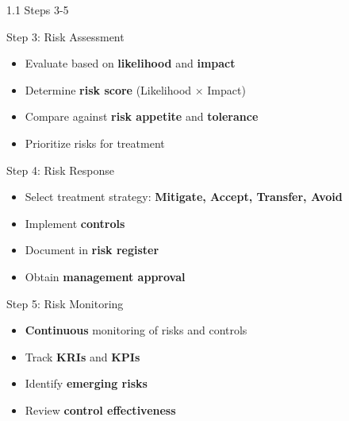 \documentclass[9pt]{beamer}  %
\begin{document}
	\begin{frame}{1.1 Steps 3-5}
		\begin{block}{Step 3: Risk Assessment}
			\begin{itemize}
				\item Evaluate based on \textbf{likelihood} and \textbf{impact}
				\item Determine \textbf{risk score} (Likelihood × Impact)
				\item Compare against \textbf{risk appetite} and \textbf{tolerance}
				\item Prioritize risks for treatment
			\end{itemize}
		\end{block}
		
		\begin{block}{Step 4: Risk Response}
			\begin{itemize}
				\item Select treatment strategy: \textbf{Mitigate, Accept, Transfer, Avoid}
				\item Implement \textbf{controls}
				\item Document in \textbf{risk register}
				\item Obtain \textbf{management approval}
			\end{itemize}
		\end{block}
		
		\begin{block}{Step 5: Risk Monitoring}
			\begin{itemize}
				\item \textbf{Continuous} monitoring of risks and controls
				\item Track \textbf{KRIs} and \textbf{KPIs}
				\item Identify \textbf{emerging risks}
				\item Review \textbf{control effectiveness}
			\end{itemize}
		\end{block}
	\end{frame}
	
\end{document}
